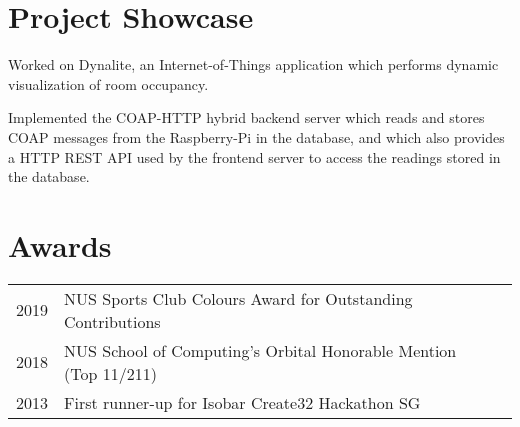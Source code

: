\documentclass[a4paper]{deedy-resume-openfont} %
\begin{document}
\begin{minipage}[t]{0.60\textwidth}

\section{Project Showcase}
\begin{tightemize}
\item Worked on Dynalite, an Internet-of-Things application which performs dynamic visualization of room occupancy.
\item Implemented the COAP-HTTP hybrid backend server which reads and stores COAP messages from the Raspberry-Pi in the database, and which also provides a HTTP REST API used by the frontend server to access the readings stored in the database.
\end{tightemize}
\sectionsep


\section{Awards} 
\begin{tabular}{rll}
2019 & NUS Sports Club Colours Award for Outstanding Contributions\\
2018 & NUS School of Computing's Orbital Honorable Mention (Top 11/211)\\
2013 & First runner-up for Isobar Create32 Hackathon SG\\
\end{tabular}
\sectionsep

% 


\end{minipage}
\end{document}
